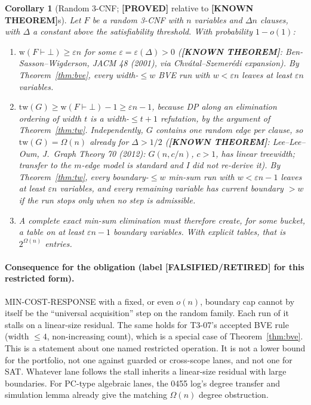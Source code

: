 \documentclass[11pt]{article}
\newtheorem{corollary}{Corollary}
\theoremstyle{definition}
\theoremstyle{remark}
\newcommand{\lab}[1]{\textbf{[#1]}}
\newcommand{\tw}{\mathrm{tw}}
\begin{document}
\begin{corollary}[Random 3-CNF; \lab{PROVED} relative to \lab{KNOWN THEOREM}s]\label{cor:rand}
Let $F$ be a random 3-CNF with $n$ variables and $\Delta n$ clauses, with $\Delta$ a
constant above the satisfiability threshold. With probability $1-o(1)$:
\begin{enumerate}
\item[(a)] $\mathrm{w}(F\vdash\bot)\ge\varepsilon n$ for some $\varepsilon=\varepsilon(\Delta)>0$
(\lab{KNOWN THEOREM}: Ben-Sasson--Wigderson, JACM 48 (2001), via Chv\'atal--Szemer\'edi
expansion). By Theorem~\ref{thm:bve}, every width-$\le w$ BVE run with $w<\varepsilon n$
leaves at least $\varepsilon n$ variables.
\item[(b)] $\tw(G)\ge\mathrm{w}(F\vdash\bot)-1\ge\varepsilon n-1$, because DP along an elimination
ordering of width $t$ is a width-$\le t{+}1$ refutation, by the argument of
Theorem~\ref{thm:tw}. Independently, $G$ contains one random edge per clause, so
$\tw(G)=\Omega(n)$ already for $\Delta>1/2$ (\lab{KNOWN THEOREM}: Lee--Lee--Oum, J.\ Graph
Theory 70 (2012): $G(n,c/n)$, $c>1$, has linear treewidth; transfer to the $m$-edge model is
standard and I did not re-derive it). By Theorem~\ref{thm:tw}, every boundary-$\le w$
min-sum run with $w<\varepsilon n-1$ leaves at least $\varepsilon n$ variables, and every
remaining variable has current boundary $>w$ if the run stops only when no step is
admissible.
\item[(c)] A complete exact min-sum elimination must therefore create, for some bucket, a
table on at least $\varepsilon n-1$ boundary variables. With explicit tables, that is
$2^{\Omega(n)}$ entries.
\end{enumerate}
\end{corollary}

\paragraph{Consequence for the obligation (label \lab{FALSIFIED/RETIRED} for this restricted form).}
MIN-COST-RESPONSE with a fixed, or even $o(n)$, boundary cap cannot by itself be the
``universal acquisition'' step on the random family. Each run of it stalls on a
linear-size residual. The same holds for T3-07's accepted BVE rule (width $\le4$,
non-increasing count), which is a special case of Theorem~\ref{thm:bve}. This is a
statement about one named restricted operation. It is not a lower bound for the
portfolio, not one against guarded or cross-scope lanes, and not one for SAT. Whatever
lane follows the stall inherits a linear-size residual with large boundaries. For PC-type
algebraic lanes, the 0455 log's degree transfer and simulation lemma already give the
matching $\Omega(n)$ degree obstruction.
\end{document}
